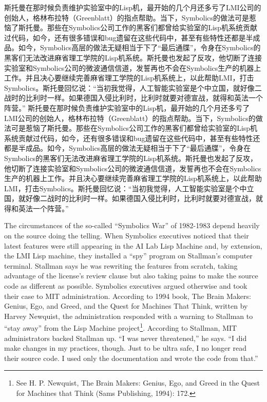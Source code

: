 \ifdefined\chs
\ifdefined\vone
斯托曼在那时候负责维护实验室中的Lisp机，最开始的几个月还多亏了LMI公司的创始人，格林布拉特（Greenblatt）的指点帮助。当下，Symbolics的做法可是惹恼了斯托曼。那些在Symbolics公司工作的黑客们都曾给实验室的Lisp机系统贡献过代码，如今，还有很多错误和bug遗留在这些代码中，甚至有些特性还都是半成品。如今，Symbolics高层的做法无疑相当于下了``最后通牒''，令身在Symbolics的黑客们无法改进麻省理工学院的Lisp机系统。斯托曼也发起了反攻，他切断了连接实验室和Symbolics公司的微波通信信道，发誓再也不会在Symbolics生产的机器上工作。并且决心要继续完善麻省理工学院的Lisp机系统上，以此帮助LMI，打击Symbolics。斯托曼回忆说：``当初我觉得，人工智能实验室是个中立国，就好像二战时的比利时一样。如果德国入侵比利时，比利时就要对德宣战，就得和英法一个阵营。''
\fi
\ifdefined\vtwo
斯托曼在那时候负责维护实验室中的Lisp机，最开始的几个月还多亏了LMI公司的创始人，格林布拉特（Greenblatt）的指点帮助。当下，Symbolics的做法可是惹恼了斯托曼。那些在Symbolics公司工作的黑客们都曾给实验室的Lisp机系统贡献过代码，如今，还有很多错误和bug遗留在这些代码中，甚至有些特性还都是半成品。如今，Symbolics高层的做法无疑相当于下了``最后通牒''，令身在Symbolics的黑客们无法改进麻省理工学院的Lisp机系统。斯托曼也发起了反攻，他切断了连接实验室和Symbolics公司的微波通信信道，发誓再也不会在Symbolics生产的机器上工作。并且决心要继续完善麻省理工学院的Lisp机系统上，以此帮助LMI，打击Symbolics。斯托曼回忆说：``当初我觉得，人工智能实验室是个中立国，就好像二战时的比利时一样。如果德国入侵比利时，比利时就要对德宣战，就得和英法一个阵营。''
\fi
\fi

\ifdefined\vone
\ifdefined\eng
The circumstances of the so-called ``Symbolics War'' of 1982-1983 depend heavily on the source doing the telling. When Symbolics executives noticed that their latest features were still appearing in the AI Lab Lisp Machine and, by extension, the LMI Lisp machine, they installed a ``spy'' program on Stallman's computer terminal. Stallman says he was rewriting the features from scratch, taking advantage of the license's review clause but also taking pains to make the source code as different as possible. Symbolics executives argued otherwise and took their case to MIT administration. According to 1994 book, The Brain Makers: Genius, Ego, and Greed, and the Quest for Machines That Think, written by Harvey Newquist, the administration responded with a warning to Stallman to ``stay away'' from the Lisp Machine project\footnote{See H. P. Newquist, The Brain Makers: Genius, Ego, and Greed in the Quest for Machines that Think (Sams Publishing, 1994): 172.}. According to Stallman, MIT administrators backed Stallman up. ``I was never threatened,'' he says. ``I did make changes in my practices, though. Just to be ultra safe, I no longer read their source code. I used only the documentation and wrote the code from that.''
\fi

